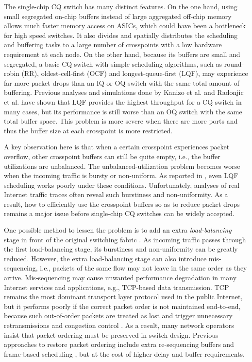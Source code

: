 \documentclass[journal,final,doublecolumn,10pt,twoside]{IEEEtranTCOM} \normalsize
\begin{document}
The single-chip CQ switch has many distinct features. On the one hand, using small segregated on-chip buffers instead of large aggregated off-chip memory allows much faster memory access on ASICs, which could have been a bottleneck for high speed switches. It also divides and spatially distributes the scheduling and buffering tasks to a large number of crosspoints with a low hardware requirement at each node. On the other hand, because its buffers are small and segregated, a basic CQ switch with simple scheduling algorithms, such as round-robin (RR), oldest-cell-first (OCF) and longest-queue-first (LQF), may experience far more packet drops than an IQ or OQ switch with the same total amount of buffering. Previous analyses and simulations done by Kanizo et al. \cite{cqs} and Radonjic et al. \cite{radonjic01,radonjic02} have shown that LQF provides the highest throughput for a CQ switch in many cases, but its performance is still worse than an OQ switch with the same total buffer space. This problem is more severe when there are more ports and thus the buffer size at each crosspoint is more restricted.

A key observation here is that when a certain crosspoint experiences packet overflow, other crosspoint buffers can still be quite empty, i.e., the buffer utilizations are unbalanced. The unbalanced-utilization problem becomes worse when the incoming traffic is bursty or non-uniform. As reported in \cite{cqs}, even LQF scheduling works poorly under these conditions. Unfortunately, analyses of real Internet traffic traces often reveal such burstiness and non-uniformity. As a result, how to efficiently use the crosspoint buffers so as to reduce packet drops remains a major issue before single-chip CQ switches can be widely accepted.

One possible method to lessen the problem is to add an extra \emph{load-balancing} stage in front of the original switching fabric \cite{lb02}. As incoming traffic passes through the first load-balancing stage, its burstiness and non-uniformity can be greatly reduced. However, the extra load-balancing stage can also introduce mis-sequencing, i.e., packets of the same flow may not leave in the same order as they arrive. Mis-sequencing may cause unwanted performance degradation in many Internet services and applications, e.g., TCP-based data transmission. TCP remains the most dominant transport layer protocol used in the public Internet, but it performs poorly if the correct packet order is not maintained end-to-end, because such out-of-order packets are treated as lost and trigger unnecessary retransmissions and congestion control \cite{tcp01}. As a result, many network operators insist that packet ordering must be preserved in switch design. Previous approaches to restore packet ordering include extra re-sequencing buffers \cite{lb02} and frame-based scheduling \cite{chuang05,frame02}, but at the cost of higher delay and buffer requirements.
\end{document}
